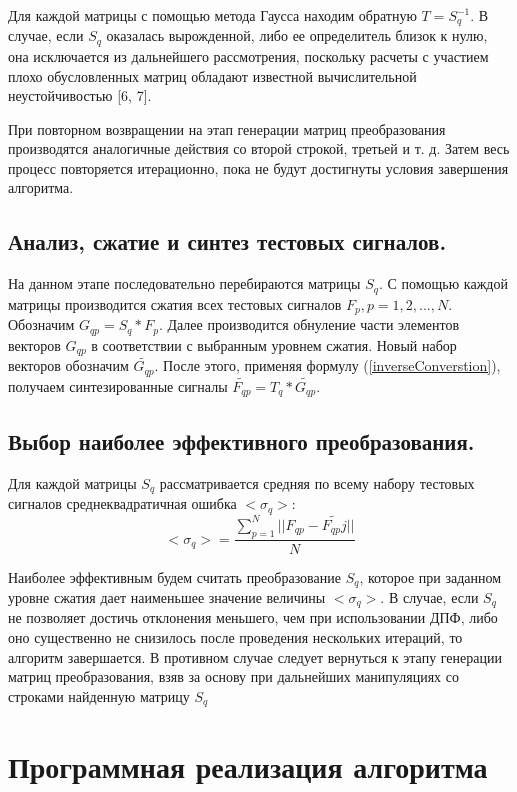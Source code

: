 \documentclass[11pt, oneside, a4paper]{article}
\begin{document}
Для каждой матрицы с помощью метода Гаусса находим обратную $T=S_q^{-1}$. В случае, если $S_q$ оказалась вырожденной, либо ее определитель близок к нулю, она исключается из дальнейшего рассмотрения, поскольку расчеты с участием плохо обусловленных матриц обладают известной вычислительной неустойчивостью [6, 7].

При повторном возвращении на этап генерации матриц преобразования производятся аналогичные действия со второй строкой, третьей и т. д. Затем весь процесс повторяется итерационно, пока не будут достигнуты условия завершения алгоритма. 

\subsection{Анализ, сжатие и синтез тестовых сигналов.}

На данном этапе последовательно перебираются матрицы $S_q$. С помощью каждой матрицы производится сжатия всех тестовых сигналов $F_p, p=1,2,...,N$. Обозначим $G_{qp}=S_q*F_p$. Далее производится обнуление части элементов векторов $G_{qp}$ в соответствии с выбранным уровнем сжатия. Новый набор векторов обозначим $\tilde{G_{qp}}$. После этого, применяя формулу (\ref{inverseConverstion}), получаем синтезированные сигналы $\tilde{F_{qp}}=T_q*\tilde{G_{qp}}$.

\subsection{Выбор наиболее эффективного преобразования.}

Для каждой матрицы $S_q$ рассматривается средняя по всему набору тестовых сигналов среднеквадратичная ошибка $<\sigma_q>$:
\begin{equation}
\label{squareNormQ}
    <\sigma_q> = \frac{\sum\limits_{p=1}^{N}||F_{qp}-\tilde{F_{qp}j}||}{N}
\end{equation}

Наиболее эффективным будем считать преобразование $S_q$, которое при заданном уровне сжатия дает наименьшее значение величины $<\sigma_q>$. В случае, если $S_q$ не позволяет достичь отклонения  меньшего, чем при использовании ДПФ, либо оно существенно не снизилось после проведения нескольких итераций, то алгоритм завершается. В противном случае следует вернуться к этапу генерации матриц преобразования, взяв за основу при дальнейших манипуляциях со строками найденную матрицу $S_q$

\section{Программная реализация алгоритма}
\end{document}
